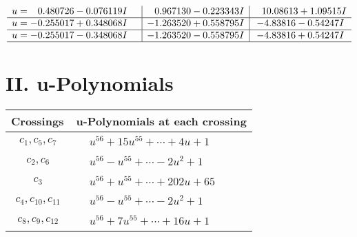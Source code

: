\documentclass[1p]{elsarticle_modified}
\theoremstyle{definition}
\begin{document}
$$\begin{array}{c|c|c}
\begin{aligned}
u &= \phantom{-}0.480726 - 0.076119 I\end{aligned}
 & \phantom{-}0.967130 - 0.223343 I & \phantom{-}10.08613 + 1.09515 I \\ \hline\begin{aligned}
u &= -0.255017 + 0.348068 I\end{aligned}
 & -1.263520 + 0.558795 I & -4.83816 - 0.54247 I \\ \hline\begin{aligned}
u &= -0.255017 - 0.348068 I\end{aligned}
 & -1.263520 - 0.558795 I & -4.83816 + 0.54247 I\\
 \hline 
 \end{array}$$\newpage
\newpage\renewcommand{\arraystretch}{1}
\centering \section*{ II. u-Polynomials}
\begin{tabular}{m{50pt}|m{274pt}}
Crossings & \hspace{64pt}u-Polynomials at each crossing \\
\hline $$\begin{aligned}c_{1},c_{5},c_{7}\end{aligned}$$&$\begin{aligned}
&u^{56}+15 u^{55}+\cdots+4 u+1
\end{aligned}$\\
\hline $$\begin{aligned}c_{2},c_{6}\end{aligned}$$&$\begin{aligned}
&u^{56}- u^{55}+\cdots-2 u^2+1
\end{aligned}$\\
\hline $$\begin{aligned}c_{3}\end{aligned}$$&$\begin{aligned}
&u^{56}+u^{55}+\cdots+202 u+65
\end{aligned}$\\
\hline $$\begin{aligned}c_{4},c_{10},c_{11}\end{aligned}$$&$\begin{aligned}
&u^{56}- u^{55}+\cdots-2 u^2+1
\end{aligned}$\\
\hline $$\begin{aligned}c_{8},c_{9},c_{12}\end{aligned}$$&$\begin{aligned}
&u^{56}+7 u^{55}+\cdots+16 u+1
\end{aligned}$\\
\hline
\end{tabular}\newpage\renewcommand{\arraystretch}{1}
\end{document}
